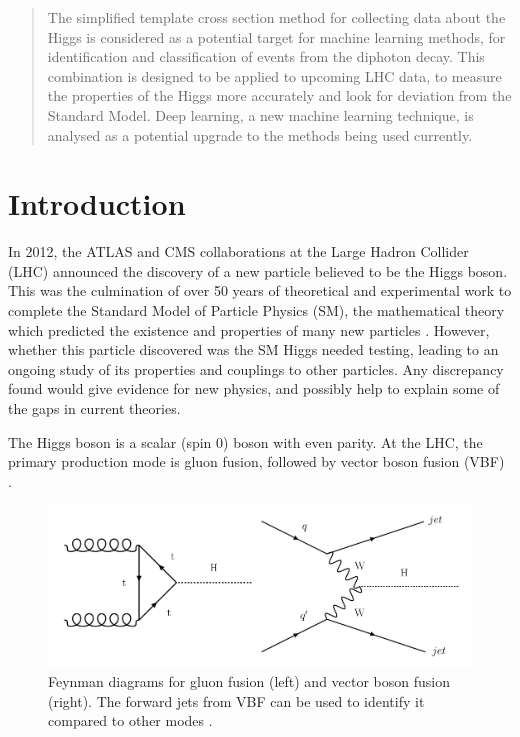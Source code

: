 \documentclass[12pt]{article}
\begin{document}
\begin{abstract}
\centering
The simplified template cross section method for collecting data about the Higgs is considered as a potential target for machine learning methods, for identification and classification of events from the diphoton decay. This combination is designed to be applied to upcoming LHC data, to measure the properties of the Higgs more accurately and look for deviation from the Standard Model. Deep learning, a new machine learning technique, is analysed as a potential upgrade to the methods being used currently. 
\end{abstract}

\section*{Introduction}
In 2012, the ATLAS \cite{atlasann} and CMS \cite{cmsannouncement} collaborations at the Large Hadron Collider (LHC) announced the discovery of a new particle believed to be the Higgs boson. This was the culmination of over 50 years of theoretical and experimental work to complete the Standard Model of Particle Physics (SM), the mathematical theory which predicted the existence and properties of many new particles \cite{smpredictions}. However, whether this particle discovered was the SM Higgs needed testing, leading to an ongoing study of its properties and couplings to other particles. Any discrepancy found would give evidence for new physics, and possibly help to explain some of the gaps in current theories.

The Higgs boson is a scalar (spin 0) boson with even parity. At the LHC, the primary production mode is gluon fusion, followed by vector boson fusion (VBF) \cite{higgsproduction}. 

\begin{figure}[H]
\centering
\includegraphics[width=12cm]{form.png}
\caption{Feynman diagrams for gluon fusion (left) and vector boson fusion (right). The forward jets from VBF can be used to identify it compared to other modes \cite{feynmanmaker}.}
	\label{form}
\end{figure}
\end{document}
